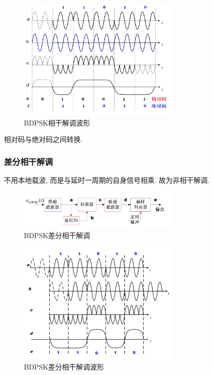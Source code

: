 \documentclass[a4paper]{report}
\begin{document}
\begin{figure}[H]
\centering
\includegraphics[width=0.7\textwidth]{bdpsk_co_wave.png}
\caption{BDPSK相干解调波形}
\end{figure}
相对码与绝对码之间转换. 

\subsubsection{差分相干解调}
不用本地载波, 而是与延时一周期的自身信号相乘. 故为非相干解调. 
\begin{figure}[H]
\centering
\includegraphics[width=0.7\textwidth]{bdpsk_non_co.png}
\caption{BDPSK差分相干解调}
\end{figure}

\begin{figure}[H]
\centering
\includegraphics[width=0.7\textwidth]{bdpsk_non_co_wave.png}
\caption{BDPSK差分相干解调波形}
\end{figure}
\end{document}

